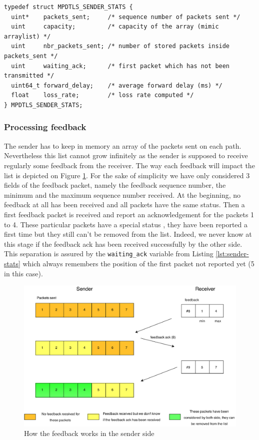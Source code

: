 \begin{lstlisting}[caption=Sender structure to store statistics, label=lst:sender-stats]
typedef struct MPDTLS_SENDER_STATS {
  uint*    packets_sent;     /* sequence number of packets sent */
  uint     capacity;         /* capacity of the array (mimic arraylist) */
  uint     nbr_packets_sent; /* number of stored packets inside packets_sent */
  uint     waiting_ack;      /* first packet which has not been transmitted */
  uint64_t forward_delay;    /* average forward delay (ms) */
  float    loss_rate;        /* loss rate computed */
} MPDTLS_SENDER_STATS;
\end{lstlisting}

\subsubsection{Processing feedback}

The sender has to keep in memory an array of the packets sent on each path. Nevertheless this list cannot grow infinitely as the sender is supposed to receive regularly some feedback from the receiver. The way each feedback will impact the list is depicted on Figure \ref{fig:feedback-imp1}. For the sake of simplicity we have only considered 3 fields of the feedback packet, namely the feedback sequence number, the minimum and the maximum sequence number received. At the beginning, no feedback at all has been received and all packets have the same status. Then a first feedback packet is received and report an acknowledgement for the packets 1 to 4. These particular packets have a special status , they have been reported a first time but they still can't be removed from the list. Indeed, we never know at this stage if the feedback ack has been received successfully by the other side. This separation is assured by the \texttt{waiting\_ack} variable from Listing \ref{lst:sender-stats} which always remembers the position of the first packet not reported yet (5 in this case). 

\begin{figure}[!ht]
\centering
\includegraphics[width=\textwidth]{images/Feedback-implem1.eps}
\caption{How the feedback works in the sender side}
\label{fig:feedback-imp1}
\end{figure}



